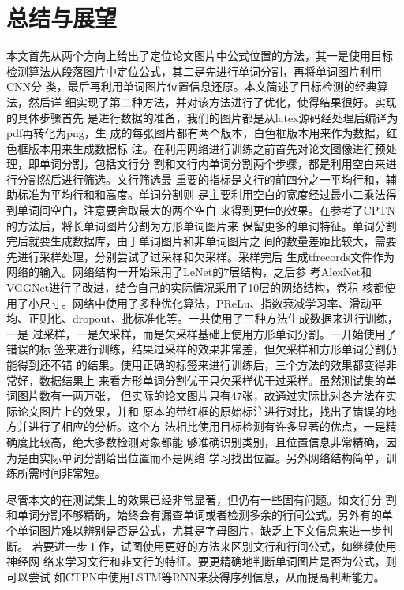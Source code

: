 \chapter{总结与展望}

本文首先从两个方向上给出了定位论文图片中公式位置的方法，其一是使用目标
检测算法从段落图片中定位公式，其二是先进行单词分割，再将单词图片利用CNN分
类，最后再利用单词图片位置信息还原。本文简述了目标检测的经典算法，然后详
细实现了第二种方法，并对该方法进行了优化，使得结果很好。实现的具体步骤首先
是进行数据的准备，我们的图片都是从latex源码经处理后编译为pdf再转化为png，生
成的每张图片都有两个版本，白色框版本用来作为数据，红色框版本用来生成数据标
注。在利用网络进行训练之前首先对论文图像进行预处理，即单词分割，包括文行分
割和文行内单词分割两个步骤，都是利用空白来进行分割然后进行筛选。文行筛选最
重要的指标是文行的前四分之一平均行和，辅助标准为平均行和和高度。单词分割则
是主要利用空白的宽度经过最小二乘法得到单词间空白，注意要舍取最大的两个空白
来得到更佳的效果。在参考了CPTN的方法后，将长单词图片分割为方形单词图片来
保留更多的单词特征。单词分割完后就要生成数据库，由于单词图片和非单词图片之
间的数量差距比较大，需要先进行采样处理，分别尝试了过采样和欠采样。采样完后
生成tfrecords文件作为网络的输入。网络结构一开始采用了LeNet的7层结构，之后参
考AlexNet和VGGNet进行了改进，结合自己的实际情况采用了10层的网络结构，卷积
核都使用了小尺寸。网络中使用了多种优化算法，PReLu、指数衰减学习率、滑动平
均、正则化、dropout、批标准化等。一共使用了三种方法生成数据来进行训练，一是
过采样，一是欠采样，而是欠采样基础上使用方形单词分割。一开始使用了错误的标
签来进行训练，结果过采样的效果非常差，但欠采样和方形单词分割仍能得到还不错
的结果。使用正确的标签来进行训练后，三个方法的效果都变得非常好，数据结果上
来看方形单词分割优于只欠采样优于过采样。虽然测试集的单词图片数有一两万张，
但实际的论文图片只有47张，故通过实际比对各方法在实际论文图片上的效果，并和
原本的带红框的原始标注进行对比，找出了错误的地方并进行了相应的分析。这个方
法相比使用目标检测有许多显著的优点，一是精确度比较高，绝大多数检测对象都能
够准确识别类别，且位置信息非常精确，因为是由实际单词分割给出位置而不是网络
学习找出位置。另外网络结构简单，训练所需时间非常短。

尽管本文的在测试集上的效果已经非常显著，但仍有一些固有问题。如文行分
割和单词分割不够精确，始终会有漏查单词或者检测多余的行间公式。另外有的单
个单词图片难以辨别是否是公式，尤其是字母图片，缺乏上下文信息来进一步判断。
若要进一步工作，试图使用更好的方法来区别文行和行间公式，如继续使用神经网
络来学习文行和非文行的特征。要更精确地判断单词图片是否为公式，则可以尝试
如CTPN中使用LSTM等RNN来获得序列信息，从而提高判断能力。
